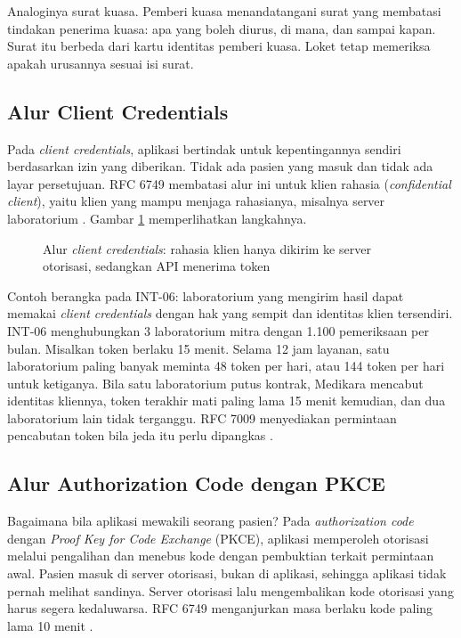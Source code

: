 Analoginya surat kuasa. Pemberi kuasa menandatangani surat yang membatasi tindakan penerima kuasa: apa yang boleh
diurus, di mana, dan sampai kapan. Surat itu berbeda dari kartu identitas pemberi kuasa. Loket tetap memeriksa apakah
urusannya sesuai isi surat.

\subsection{Alur Client Credentials}

Pada \textit{client credentials}, aplikasi bertindak untuk kepentingannya sendiri berdasarkan izin yang diberikan. Tidak
ada pasien yang masuk dan tidak ada layar persetujuan. RFC 6749 membatasi alur ini untuk klien rahasia
(\textit{confidential client}), yaitu klien yang mampu menjaga rahasianya, misalnya server laboratorium \cite{rfc6749}.
Gambar \ref{fig:ch06-alur-client-credentials} memperlihatkan langkahnya.

\begin{figure}[!htb]
  \centering
  
  \caption{Alur \textit{client credentials}: rahasia klien hanya dikirim ke server otorisasi, sedangkan API menerima token}
  \label{fig:ch06-alur-client-credentials}
\end{figure}

Contoh berangka pada INT-06: laboratorium yang mengirim hasil dapat memakai \textit{client credentials} dengan hak yang
sempit dan identitas klien tersendiri. INT-06 menghubungkan 3 laboratorium mitra dengan 1.100 pemeriksaan per bulan.
Misalkan token berlaku 15 menit. Selama 12 jam layanan, satu laboratorium paling banyak meminta 48 token per hari, atau
144 token per hari untuk ketiganya. Bila satu laboratorium putus kontrak, Medikara mencabut identitas kliennya, token
terakhir mati paling lama 15 menit kemudian, dan dua laboratorium lain tidak terganggu. RFC 7009 menyediakan permintaan
pencabutan token bila jeda itu perlu dipangkas \cite{c06-rfc7009}.

\subsection{Alur Authorization Code dengan PKCE}

Bagaimana bila aplikasi mewakili seorang pasien? Pada \textit{authorization code} dengan \textit{Proof Key for Code
Exchange} (PKCE), aplikasi memperoleh otorisasi melalui pengalihan dan menebus kode dengan pembuktian terkait permintaan
awal. Pasien masuk di server otorisasi, bukan di aplikasi, sehingga aplikasi tidak pernah melihat sandinya. Server
otorisasi lalu mengembalikan kode otorisasi yang harus segera kedaluwarsa. RFC 6749 menganjurkan masa berlaku kode
paling lama 10 menit \cite{rfc6749}.

